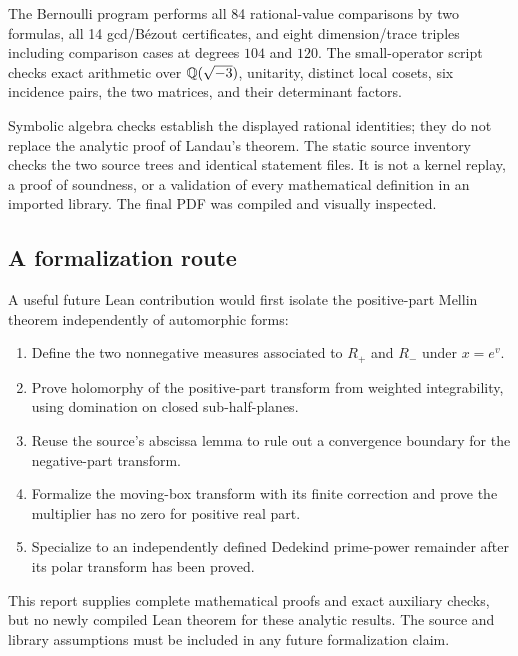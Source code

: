 The Bernoulli program performs all 84 rational-value comparisons
by two formulas, all 14 gcd/B\'ezout certificates, and eight
dimension/trace triples including comparison cases at degrees
$104$ and $120$. The small-operator script checks exact arithmetic
over $\mathbb Q(\sqrt{-3})$, unitarity, distinct local cosets, six
incidence pairs, the two matrices, and their determinant factors.

Symbolic algebra checks establish the displayed rational identities;
they do not replace the analytic proof of Landau's theorem.
The static source inventory checks the two source trees and identical
statement files. It is not a kernel replay, a proof of soundness,
or a validation of every mathematical definition in an imported
library. The final PDF was compiled and visually inspected.

\subsection{A formalization route}

A useful future Lean contribution would first isolate the positive-part
Mellin theorem independently of automorphic forms:

\begin{enumerate}
\item Define the two nonnegative measures associated to $R_+$ and
$R_-$ under $x=e^v$.
\item Prove holomorphy of the positive-part transform from weighted
integrability, using domination on closed sub-half-planes.
\item Reuse the source's abscissa lemma to rule out a convergence
boundary for the negative-part transform.
\item Formalize the moving-box transform with its finite correction
and prove the multiplier has no zero for positive real part.
\item Specialize to an independently defined Dedekind prime-power
remainder after its polar transform has been proved.
\end{enumerate}

This report supplies complete mathematical proofs and exact auxiliary
checks, but no newly compiled Lean theorem for these analytic results.
The source and library assumptions must be included in any future
formalization claim.
